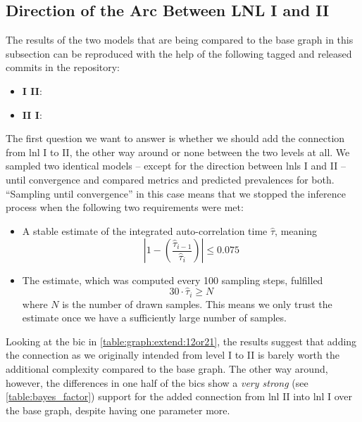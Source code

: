\documentclass[\relativeRoot/main.tex]{subfiles}
\begin{document}
\subsection{Direction of the Arc Between LNL I and II}
\label{subsec:graph:extended:IandII}

\begin{tcolorbox}[title=\faIcon{recycle} Reproducibility, parbox=false]
    The results of the two models that are being compared to the base graph in this subsection can be reproduced with the help of the following tagged and released commits in the  repository:

    \begin{itemize}
        \item \textbf{I  II}: 
        \item \textbf{II  I}: 
    \end{itemize}
\end{tcolorbox}

The first question we want to answer is whether we should add the connection from \gls{lnl} I to II, the other way around or none between the two levels at all. We sampled two identical models -- except for the direction between \glspl{lnl} I and II -- until convergence and compared metrics and predicted prevalences for both. ``Sampling until convergence'' in this case means that we stopped the inference process when the following two requirements were met:

\begin{itemize}
    \item A stable estimate of the integrated auto-correlation time $\hat{\tau}$, meaning
    \begin{equation}
        \left| 1 - \left( \frac{\hat{\tau}_{i-1}}{\hat{\tau}_i} \right) \right| \leq 0.075
    \end{equation}
    \item The estimate, which was computed every 100 sampling steps, fulfilled
    \begin{equation}
        30 \cdot \hat{\tau}_i \geq N
    \end{equation}
    where $N$ is the number of drawn samples. This means we only trust the estimate once we have a sufficiently large number of samples.
\end{itemize}

Looking at the \gls{bic} in \cref{table:graph:extend:12or21}, the results suggest that adding the connection as we originally intended from level I to II is barely worth the additional complexity compared to the base graph. The other way around, however, the differences in one half of the \glspl{bic} show a \emph{very strong} (see \cref{table:bayes_factor}) support for the added connection from \gls{lnl} II into \gls{lnl} I over the base graph, despite having one parameter more.
\end{document}
